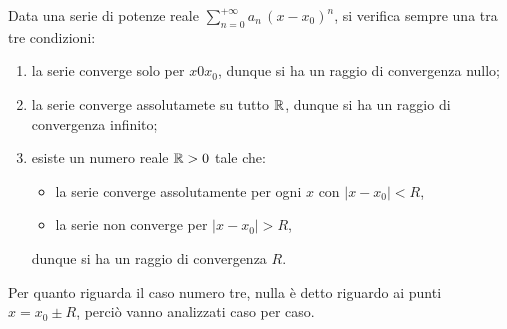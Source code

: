 \documentclass[../../analisi2]{subfiles}
\begin{document}
        \begin{teorema}
            Data una serie di potenze reale \(\sum_{n = 0}^{+\infty} a_n \, (x - x_0)^n\), si verifica sempre una tra tre condizioni:
            \begin{enumerate}
                \item la serie converge solo per \(x 0 x_0\), dunque si ha un raggio di convergenza nullo;
                \item la serie converge assolutamete su tutto \(\mathbb{R}\), dunque si ha un raggio di convergenza infinito;
                \item esiste un numero reale \(\mathbb{R} > 0\) tale che:
                    \begin{itemize}
                        \item la serie converge assolutamente per ogni \(x\) con \(|x - x_0|  < R\),
                        \item la serie non converge per \(|x - x_0| > R\),
                    \end{itemize}
                    dunque si ha un raggio di convergenza \(R\).
            \end{enumerate}
        \end{teorema}
        \begin{osservazione}
            Per quanto riguarda il caso numero tre, nulla è detto riguardo ai punti \(x = x_0 \pm R\), perciò vanno analizzati caso
            per caso.
        \end{osservazione}
\end{document}
